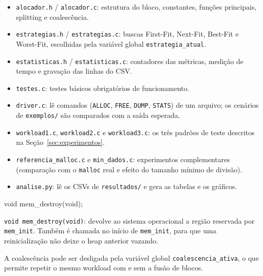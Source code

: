 \begin{itemize}
    \item \texttt{alocador.h} / \texttt{alocador.c}: estrutura do bloco, constantes, funções principais, splitting e coalescência.
    \item \texttt{estrategias.h} / \texttt{estrategias.c}: buscas First-Fit, Next-Fit, Best-Fit e Worst-Fit, escolhidas pela variável global \texttt{estrategia\_atual}.
    \item \texttt{estatisticas.h} / \texttt{estatisticas.c}: contadores das métricas, medição de tempo e gravação das linhas do CSV.
    \item \texttt{testes.c}: testes básicos obrigatórios de funcionamento.
    \item \texttt{driver.c}: lê comandos (\texttt{ALLOC}, \texttt{FREE}, \texttt{DUMP}, \texttt{STATS}) de um arquivo; os cenários de \texttt{exemplos/} são comparados com a saída esperada.
    \item \texttt{workload1.c}, \texttt{workload2.c} e \texttt{workload3.c}: os três padrões de teste descritos na Seção~\ref{sec:experimentos}.
    \item \texttt{referencia\_malloc.c} e \texttt{min\_dados.c}: experimentos complementares (comparação com o \texttt{malloc} real e efeito do tamanho mínimo de divisão).
    \item \texttt{analise.py}: lê os CSVs de \texttt{resultados/} e gera as tabelas e os gráficos.
\end{itemize}

void  mem_destroy(void);

\item \texttt{void mem\_destroy(void)}: devolve ao sistema operacional a região reservada por \texttt{mem\_init}. Também é chamada no início de \texttt{mem\_init}, para que uma reinicialização não deixe o heap anterior vazando.

A coalescência pode ser desligada pela variável global
\texttt{coalescencia\_ativa}, o que permite repetir o mesmo workload com e sem
a fusão de blocos.

